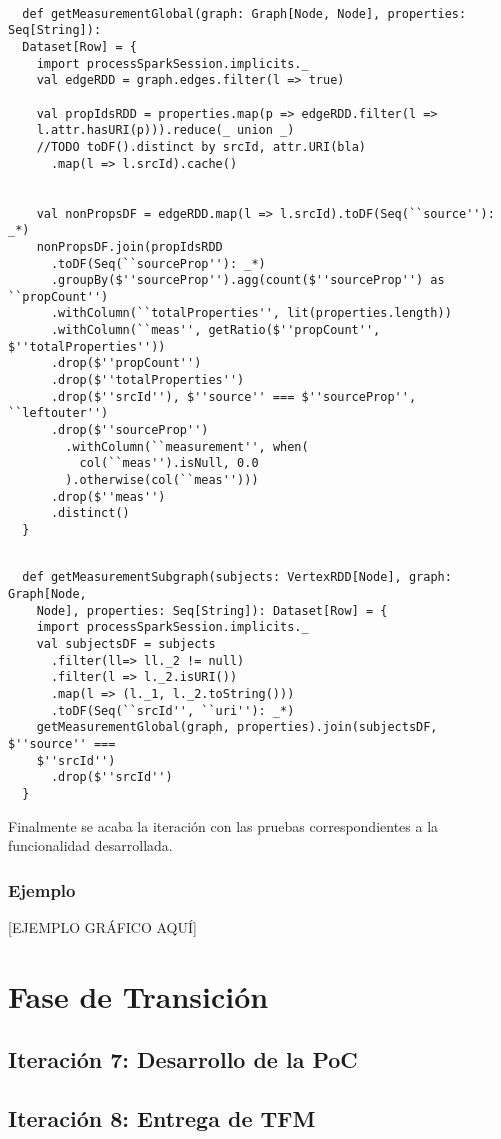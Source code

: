 \lstset{escapechar=@,language=scala}
\begin{lstlisting}[caption={Cálculo de la métrica en el grafo},captionpos=b, label=graphmetricSCglobal]

  def getMeasurementGlobal(graph: Graph[Node, Node], properties: Seq[String]):
  Dataset[Row] = {
    import processSparkSession.implicits._
    val edgeRDD = graph.edges.filter(l => true)

    val propIdsRDD = properties.map(p => edgeRDD.filter(l =>
    l.attr.hasURI(p))).reduce(_ union _)
    //TODO toDF().distinct by srcId, attr.URI(bla)
      .map(l => l.srcId).cache()


    val nonPropsDF = edgeRDD.map(l => l.srcId).toDF(Seq(``source''): _*)
    nonPropsDF.join(propIdsRDD
      .toDF(Seq(``sourceProp''): _*)
      .groupBy($''sourceProp'').agg(count($''sourceProp'') as ``propCount'')
      .withColumn(``totalProperties'', lit(properties.length))
      .withColumn(``meas'', getRatio($''propCount'', $''totalProperties''))
      .drop($''propCount'')
      .drop($''totalProperties'')
      .drop($''srcId''), $''source'' === $''sourceProp'', ``leftouter'')
      .drop($''sourceProp'')
        .withColumn(``measurement'', when(
          col(``meas'').isNull, 0.0
        ).otherwise(col(``meas'')))
      .drop($''meas'')
      .distinct()
  }

\end{lstlisting}
\lstset{escapechar=@,language=scala}
\begin{lstlisting}[caption={Cálculo de la métrica en colección de nodos},captionpos=b, label=graphmetricSC]

  def getMeasurementSubgraph(subjects: VertexRDD[Node], graph: Graph[Node,
    Node], properties: Seq[String]): Dataset[Row] = {
    import processSparkSession.implicits._
    val subjectsDF = subjects
      .filter(ll=> ll._2 != null)
      .filter(l => l._2.isURI())
      .map(l => (l._1, l._2.toString()))
      .toDF(Seq(``srcId'', ``uri''): _*)
    getMeasurementGlobal(graph, properties).join(subjectsDF, $''source'' ===
    $''srcId'')
      .drop($''srcId'')
  }

\end{lstlisting}

Finalmente se acaba la iteración con las pruebas correspondientes a la
funcionalidad desarrollada. 

\subsubsection{Ejemplo}
[EJEMPLO GRÁFICO AQUÍ]

\section{Fase de Transición}

\subsection{Iteración 7: Desarrollo de la PoC}



\subsection{Iteración 8: Entrega de TFM}


